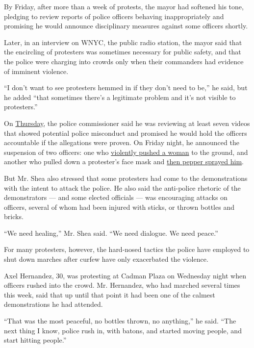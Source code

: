 By Friday, after more than a week of protests, the mayor had softened
his tone, pledging to review reports of police officers behaving
inappropriately and promising he would announce disciplinary measures
against some officers shortly.

Later, in an interview on WNYC, the public radio station, the mayor said
that the encircling of protesters was sometimes necessary for public
safety, and that the police were charging into crowds only when their
commanders had evidence of imminent violence.

``I don't want to see protesters hemmed in if they don't need to be,''
he said, but he added ``that sometimes there's a legitimate problem and
it's not visible to protesters.''

On
\href{https://www.nbcnews.com/news/us-news/new-york-officers-could-face-suspension-after-street-clashes-commissioner-n1225391}{Thursday},
the police commissioner said he was reviewing at least seven videos that
showed potential police misconduct and promised he would hold the
officers accountable if the allegations were proven. On Friday night, he
announced the suspension of two officers: one who
\href{https://newyork.cbslocal.com/2020/06/03/woman-seen-on-video-shoved-to-ground-by-nypd-officer-demands-accountability/}{violently
pushed a woman} to the ground, and another who pulled down a protester's
face mask and
\href{https://www.tmz.com/2020/05/31/mask-cops-nypd-protester-george-floyd-death-police/}{then
pepper sprayed him}.

But Mr. Shea also stressed that some protesters had come to the
demonstrations with the intent to attack the police. He also said the
anti-police rhetoric of the demonstrators --- and some elected officials
--- was encouraging attacks on officers, several of whom had been
injured with sticks, or thrown bottles and bricks.

``We need healing,'' Mr. Shea said. ``We need dialogue. We need peace.''

For many protesters, however, the hard-nosed tactics the police have
employed to shut down marches after curfew have only exacerbated the
violence.

Axel Hernandez, 30, was protesting at Cadman Plaza on Wednesday night
when officers rushed into the crowd. Mr. Hernandez, who had marched
several times this week, said that up until that point it had been one
of the calmest demonstrations he had attended.

``That was the most peaceful, no bottles thrown, no anything,'' he said.
``The next thing I know, police rush in, with batons, and started moving
people, and start hitting people.''

